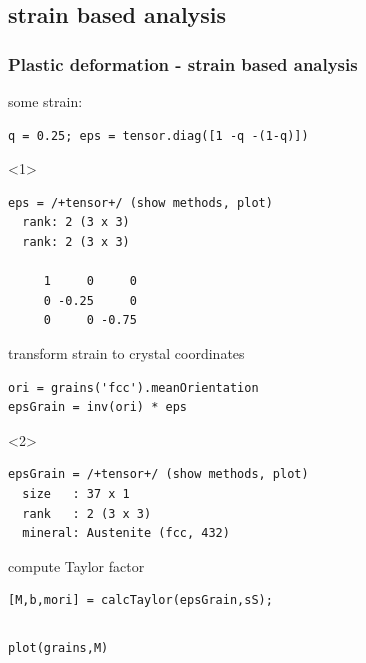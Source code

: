\documentclass[compress]{beamer}
\begin{document}
\subsection*{strain based analysis}

\begin{frame}[fragile]
  \frametitle{Plastic deformation - strain based analysis}

some strain:
\vspace{-0.2cm}
      \begin{lstlisting}[style=input]
q = 0.25; eps = tensor.diag([1 -q -(1-q)])
      \end{lstlisting}
      \begin{onlyenv}<1>
        \vspace{-0.2cm}
        \begin{lstlisting}[style=output]
eps = /+tensor+/ (show methods, plot)
  rank: 2 (3 x 3)
  rank: 2 (3 x 3)

     1     0     0
     0 -0.25     0
     0     0 -0.75
   \end{lstlisting}
    \end{onlyenv}

\pause

    transform strain to crystal coordinates
    \vspace{-0.2cm}
      \begin{lstlisting}[style=input]
ori = grains('fcc').meanOrientation
epsGrain = inv(ori) * eps
      \end{lstlisting}
      \begin{onlyenv}<2>
        \vspace{-0.2cm}
        \begin{lstlisting}[style=output]
epsGrain = /+tensor+/ (show methods, plot)
  size   : 37 x 1
  rank   : 2 (3 x 3)
  mineral: Austenite (fcc, 432)
        \end{lstlisting}
      \end{onlyenv}

      \pause

compute Taylor factor
      \vspace{-0.2cm}
\begin{lstlisting}[style=input]
[M,b,mori] = calcTaylor(epsGrain,sS);
\end{lstlisting}

  \begin{columns}
    \begin{column}{0.62\textwidth}

        \vspace{-0.5cm}
\begin{lstlisting}[style=input]
plot(grains,M)
      \end{lstlisting}


\end{column}
\end{columns}
\end{frame}
\end{document}
